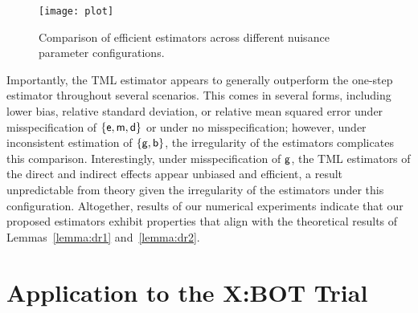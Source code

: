 \begin{figure}[H]
  \centering
  \texttt{[image: plot]}
  \caption{Comparison of efficient estimators across different nuisance
    parameter configurations.}\label{fig:simula}
\end{figure}
Importantly, the TML estimator appears to generally outperform the one-step
estimator throughout several scenarios. This comes in several forms, including
lower bias, relative standard deviation, or relative mean squared error under
misspecification of $\{\mathsf{e}, \mathsf{m}, \mathsf{d}\}$ or under no misspecification; however,
under inconsistent estimation of $\{\mathsf{g}, \mathsf{b}\}$, the irregularity of the
estimators complicates this comparison. Interestingly, under misspecification of
$\mathsf{g}$, the TML estimators of the direct and indirect effects appear unbiased and
efficient, a result unpredictable from theory given the irregularity of the
estimators under this configuration. Altogether, results of our numerical
experiments indicate that our proposed estimators exhibit properties that align
with the theoretical results of Lemmas~\ref{lemma:dr1} and~\ref{lemma:dr2}.

\section{Application to the X:BOT Trial}\label{sec:applic}

